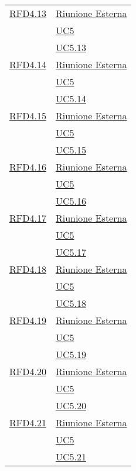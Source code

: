 \begin{longtable}{|>{\centering}m{5cm}|m{5cm}<{\centering}|}
\hyperlink{RFD4.13}{RFD4.13} & \hyperlink{Riunione Esterna}{Riunione Esterna}\\ &\hyperref[UC5]{UC5}\\ &\hyperref[UC5.13]{UC5.13}\\ \hline

\hyperlink{RFD4.14}{RFD4.14} & \hyperlink{Riunione Esterna}{Riunione Esterna}\\ &\hyperref[UC5]{UC5}\\ &\hyperref[UC5.14]{UC5.14}\\ \hline

\hyperlink{RFD4.15}{RFD4.15} & \hyperlink{Riunione Esterna}{Riunione Esterna}\\ &\hyperref[UC5]{UC5}\\ &\hyperref[UC5.15]{UC5.15}\\ \hline

\hyperlink{RFD4.16}{RFD4.16} &  \hyperlink{Riunione Esterna}{Riunione Esterna}\\ &\hyperref[UC5]{UC5}\\ &\hyperref[UC5.16]{UC5.16}\\ \hline

\hyperlink{RFD4.17}{RFD4.17} &  \hyperlink{Riunione Esterna}{Riunione Esterna}\\ &\hyperref[UC5]{UC5}\\  &\hyperref[UC5.17]{UC5.17}\\ \hline

\hyperlink{RFD4.18}{RFD4.18} & \hyperlink{Riunione Esterna}{Riunione Esterna}\\ &\hyperref[UC5]{UC5}\\ &\hyperref[UC5.18]{UC5.18}\\ \hline

\hyperlink{RFD4.19}{RFD4.19} & \hyperlink{Riunione Esterna}{Riunione Esterna}\\ &\hyperref[UC5]{UC5}\\  &\hyperref[UC5.19]{UC5.19}\\ \hline

\hyperlink{RFD4.20}{RFD4.20} &   \hyperlink{Riunione Esterna}{Riunione Esterna}\\ &\hyperref[UC5]{UC5}\\ &\hyperref[UC5.20]{UC5.20}\\ \hline

\hyperlink{RFD4.21}{RFD4.21} & \hyperlink{Riunione Esterna}{Riunione Esterna}\\ &\hyperref[UC5]{UC5}\\  &\hyperref[UC5.21]{UC5.21}\\ \hline


\end{longtable}
